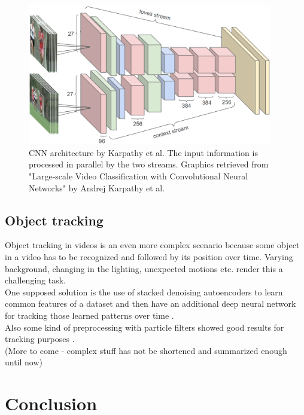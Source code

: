 \documentclass[12pt,twoside]{article}
\theoremstyle{plain}
\theoremstyle{definition}
\theoremstyle{remark}
\begin{document}
\begin{figure}[H]
	\centerline{
		\includegraphics[width=0.95\textwidth]{google-architecture.png}
	}
	{\caption{CNN architecture by Karpathy et al. The input information is processed in parallel by the two streams. Graphics retrieved from "Large-scale Video Classification with Convolutional Neural Networks" by Andrej Karpathy et al. \cite{GoogleLargeScaleVideoClassification-Karpathy}}\label{fig:google-architecture-two-streams}}
\end{figure}


\subsection{Object tracking}

Object tracking in videos is an even more complex scenario because some object in a video has to be recognized and followed by its position over time. Varying background, changing in the lighting, unexpected motions etc. render this a challenging task.
\\
One supposed solution is the use of stacked denoising autoencoders to learn common features of a dataset and then have an additional deep neural network for tracking those learned patterns over time \cite{LearningDeepCompactImageTracking-Wang}.
\\
Also some kind of preprocessing with particle filters showed good results for tracking purposes \cite{LearningDeepCompactImageTracking-Wang}.
\\
(More to come - complex stuff has not be shortened and summarized enough until now)



\section{Conclusion}
\label{sec:concl}
\end{document}
